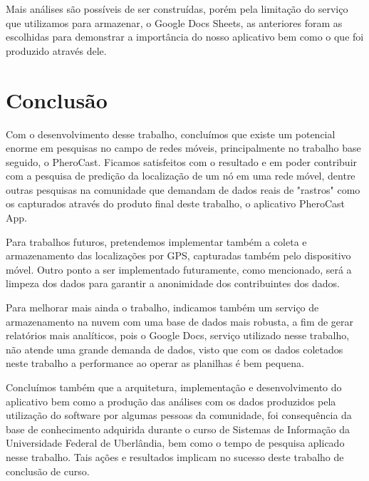 \documentclass[12pt, %
openright, 
oneside,
a4paper,
brazil]{facom-ufu-abntex2}
\begin{document}
Mais análises são possíveis de ser construídas, porém pela limitação do serviço que utilizamos para armazenar, o Google Docs Sheets, as anteriores foram as escolhidas para demonstrar a importância do nosso aplicativo bem como o que foi produzido através dele.

\chapter{Conclusão}
Com o desenvolvimento desse trabalho, concluímos que existe um potencial enorme em pesquisas no campo de redes móveis, principalmente no trabalho base seguido, o PheroCast. Ficamos satisfeitos com o resultado e em poder contribuir com a pesquisa de predição da localização de um nó em uma rede móvel, dentre outras pesquisas na comunidade que demandam de dados reais de "rastros" como os capturados através do produto final deste trabalho, o aplicativo PheroCast App.

Para trabalhos futuros, pretendemos implementar também a coleta e armazenamento das localizações por GPS, capturadas também pelo dispositivo móvel. Outro ponto a ser implementado futuramente, como mencionado, será a limpeza dos dados para garantir a anonimidade dos contribuintes dos dados.

Para melhorar mais ainda o trabalho, indicamos também um serviço de armazenamento na nuvem com uma base de dados mais robusta, a fim de gerar relatórios mais analíticos, pois o Google Docs, serviço utilizado nesse trabalho, não atende uma grande demanda de dados, visto que com os dados coletados neste trabalho a performance ao operar as planilhas é bem pequena. 

Concluímos também que a arquitetura, implementação e desenvolvimento do aplicativo bem como a produção das análises com os dados produzidos pela utilização do software por algumas pessoas da comunidade, foi consequência da base de conhecimento adquirida durante o curso de Sistemas de Informação da Universidade Federal de Uberlândia, bem como o tempo de pesquisa aplicado nesse trabalho. Tais ações e resultados implicam no sucesso deste trabalho de conclusão de curso.


\end{document}
